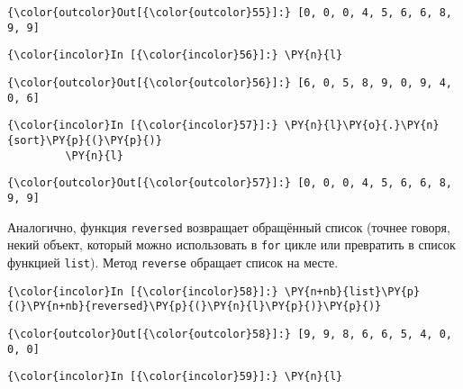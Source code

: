             \begin{Verbatim}[commandchars=\\\{\}]
{\color{outcolor}Out[{\color{outcolor}55}]:} [0, 0, 0, 4, 5, 6, 6, 8, 9, 9]
\end{Verbatim}
        
    \begin{Verbatim}[commandchars=\\\{\}]
{\color{incolor}In [{\color{incolor}56}]:} \PY{n}{l}
\end{Verbatim}

            \begin{Verbatim}[commandchars=\\\{\}]
{\color{outcolor}Out[{\color{outcolor}56}]:} [6, 0, 5, 8, 9, 0, 9, 4, 0, 6]
\end{Verbatim}
        
    \begin{Verbatim}[commandchars=\\\{\}]
{\color{incolor}In [{\color{incolor}57}]:} \PY{n}{l}\PY{o}{.}\PY{n}{sort}\PY{p}{(}\PY{p}{)}
         \PY{n}{l}
\end{Verbatim}

            \begin{Verbatim}[commandchars=\\\{\}]
{\color{outcolor}Out[{\color{outcolor}57}]:} [0, 0, 0, 4, 5, 6, 6, 8, 9, 9]
\end{Verbatim}
        
    Аналогично, функция \texttt{reversed} возвращает обращённый список
(точнее говоря, некий объект, который можно использовать в \texttt{for}
цикле или превратить в список функцией \texttt{list}). Метод
\texttt{reverse} обращает список на месте.

    \begin{Verbatim}[commandchars=\\\{\}]
{\color{incolor}In [{\color{incolor}58}]:} \PY{n+nb}{list}\PY{p}{(}\PY{n+nb}{reversed}\PY{p}{(}\PY{n}{l}\PY{p}{)}\PY{p}{)}
\end{Verbatim}

            \begin{Verbatim}[commandchars=\\\{\}]
{\color{outcolor}Out[{\color{outcolor}58}]:} [9, 9, 8, 6, 6, 5, 4, 0, 0, 0]
\end{Verbatim}
        
    \begin{Verbatim}[commandchars=\\\{\}]
{\color{incolor}In [{\color{incolor}59}]:} \PY{n}{l}
\end{Verbatim}

